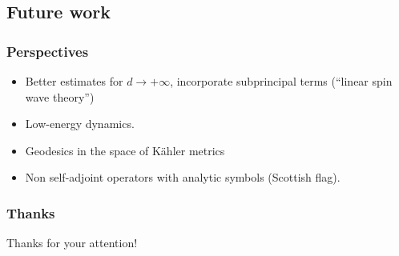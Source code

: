 \documentclass[mathserif]{beamer}
\begin{document}
 \subsection{Future work}
\begin{frame}
  \frametitle{Perspectives}
    \begin{itemize}
    \item Better estimates for $d \to +\infty$, incorporate
      subprincipal terms (``linear spin wave theory'')
    \item Low-energy dynamics.
    \item Geodesics in the space of Kähler metrics
    \item Non self-adjoint operators with analytic symbols (Scottish flag).
    \end{itemize}
  \end{frame}

  \begin{frame}
    \frametitle{Thanks}
    \centering 
    {\Large Thanks for your attention!}
  \end{frame}
\end{document}
